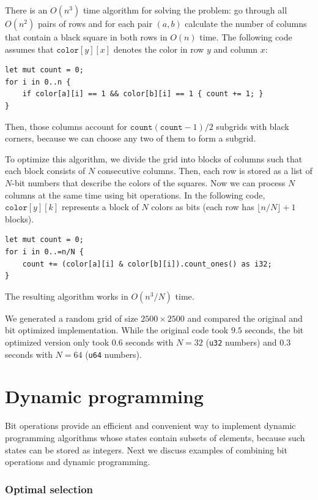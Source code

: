 There is an $O(n^3)$ time algorithm for solving the problem:
go through all $O(n^2)$ pairs of rows and for each pair
$(a,b)$ calculate the number of columns that contain a black
square in both rows in $O(n)$ time.
The following code assumes that $\texttt{color}[y][x]$
denotes the color in row $y$ and column $x$:
\begin{lstlisting}
let mut count = 0;
for i in 0..n {
    if color[a][i] == 1 && color[b][i] == 1 { count += 1; }
}
\end{lstlisting}
Then, those columns
account for $\texttt{count}(\texttt{count}-1)/2$ subgrids with black corners,
because we can choose any two of them to form a subgrid.

To optimize this algorithm, we divide the grid into blocks
of columns such that each block consists of $N$
consecutive columns. Then, each row is stored as
a list of $N$-bit numbers that describe the colors
of the squares. Now we can process $N$ columns at the same time
using bit operations. In the following code,
$\texttt{color}[y][k]$ represents
a block of $N$ colors as bits
(each row has $\lfloor n/N \rfloor + 1$ blocks).
\begin{lstlisting}
let mut count = 0;
for i in 0..=n/N {
    count += (color[a][i] & color[b][i]).count_ones() as i32;
}
\end{lstlisting}
The resulting algorithm works in $O(n^3/N)$ time.

We generated a random grid of size $2500 \times 2500$
and compared the original and bit optimized implementation.
While the original code took $9.5$ seconds,
the bit optimized version only took $0.6$ seconds
with $N=32$ (\texttt{u32} numbers) and $0.3$ seconds
with $N=64$ (\texttt{u64} numbers).

\section{Dynamic programming}

Bit operations provide an efficient and convenient
way to implement dynamic programming algorithms
whose states contain subsets of elements,
because such states can be stored as integers.
Next we discuss examples of combining
bit operations and dynamic programming.

\subsubsection{Optimal selection}

